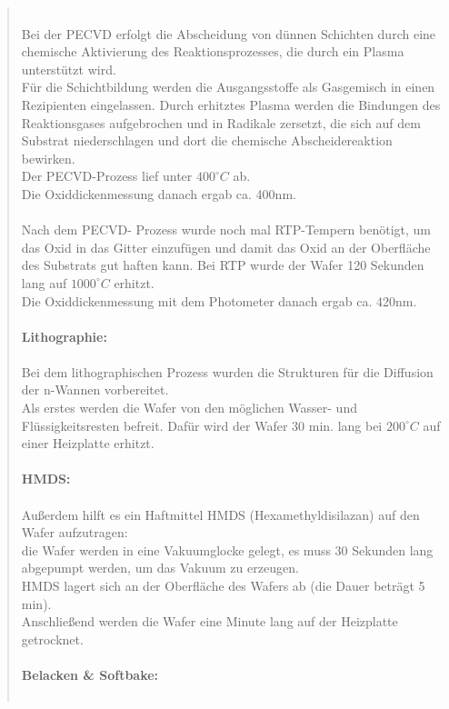 \begin{quote}
			\\
			Bei der PECVD erfolgt die Abscheidung von dünnen Schichten durch
			eine chemische Aktivierung des Reaktionsprozesses, die durch ein
			Plasma unterstützt wird.\\
			Für die Schichtbildung werden die Ausgangsstoffe als Gasgemisch in
			einen Rezipienten eingelassen. Durch erhitztes Plasma werden die
			Bindungen des Reaktionsgases aufgebrochen und in Radikale zersetzt,
			die sich auf dem Substrat niederschlagen und dort die chemische
			Abscheidereaktion bewirken.\\
 			Der PECVD-Prozess lief unter $400^{\circ}C$ ab.\\
 			Die Oxiddickenmessung danach ergab ca. 400nm.\\
			\\
			Nach dem PECVD- Prozess wurde noch mal RTP-Tempern benötigt, um das
			Oxid in das Gitter einzufügen und damit das Oxid an der Oberfläche
			des Substrats gut haften kann. Bei RTP wurde der Wafer 120 Sekunden
			lang auf $1000^{\circ}C$ erhitzt.\\
			Die Oxiddickenmessung mit dem Photometer danach ergab ca. 420nm.\\
			\\
			\textbf{Lithographie:}\\
			\\
			Bei dem lithographischen Prozess wurden die Strukturen für die
			Diffusion der n-Wannen vorbereitet.\\
			Als erstes werden die Wafer von den möglichen Wasser- und
			Flüssigkeitsresten befreit. Dafür wird der Wafer 30 min. lang bei
			$200^{\circ}C$ auf einer Heizplatte erhitzt.\\
			\\
			\textbf{HMDS:}\\
			\\
			Außerdem hilft es ein Haftmittel HMDS (Hexamethyldisilazan) auf den
			Wafer aufzutragen:\\
			die Wafer werden in eine Vakuumglocke gelegt, es muss 30 Sekunden
			lang abgepumpt werden, um das Vakuum zu erzeugen.\\
			HMDS  lagert sich an der Oberfläche des Wafers ab (die Dauer beträgt
			5 min). \\
			Anschließend werden die Wafer  eine Minute lang auf der Heizplatte
			getrocknet.\\
			\\
			\textbf{Belacken \& Softbake:}\\
			\\

\end{quote}
